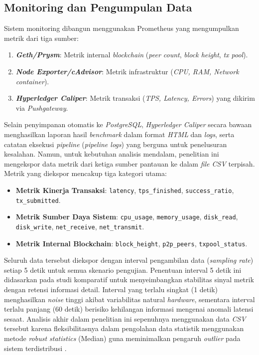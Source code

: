 \subsection{Monitoring dan Pengumpulan Data}
Sistem monitoring dibangun menggunakan Prometheus yang mengumpulkan metrik dari tiga sumber:
\begin{enumerate}
    \item \textbf{\textit{Geth/Prysm}}: Metrik internal \textit{blockchain} (\textit{peer count}, \textit{block height}, \textit{tx pool}).
    \item \textbf{\textit{Node Exporter/cAdvisor}}: Metrik infrastruktur (\textit{CPU, RAM, Network container}).
    \item \textbf{\textit{Hyperledger Caliper}}: Metrik transaksi (\textit{TPS, Latency, Errors}) yang dikirim via \textit{Pushgateway}.
\end{enumerate}

Selain penyimpanan otomatis ke \textit{PostgreSQL}, \textit{Hyperledger Caliper} secara bawaan menghasilkan laporan hasil \textit{benchmark} dalam format \textit{HTML} dan \textit{logs}, serta catatan eksekusi \textit{pipeline} (\textit{pipeline logs}) yang berguna untuk penelusuran kesalahan. Namun, untuk kebutuhan analisis mendalam, penelitian ini mengekspor data metrik dari ketiga sumber pantauan ke dalam \textit{file CSV} terpisah. Metrik yang diekspor mencakup tiga kategori utama:
\begin{itemize}
    \item \textbf{Metrik Kinerja Transaksi}: \texttt{latency}, \texttt{tps\_finished}, \texttt{success\_ratio}, \texttt{tx\_submitted}.
    \item \textbf{Metrik Sumber Daya Sistem}: \texttt{cpu\_usage}, \texttt{memory\_usage}, \texttt{disk\_read}, \texttt{disk\_write}, \texttt{net\_receive}, \texttt{net\_transmit}.
    \item \textbf{Metrik Internal Blockchain}: \texttt{block\_height}, \texttt{p2p\_peers}, \texttt{txpool\_status}.
\end{itemize}

Seluruh data tersebut diekspor dengan interval pengambilan data (\textit{sampling rate}) setiap 5 detik untuk semua skenario pengujian. Penentuan interval 5 detik ini didasarkan pada studi komparatif untuk menyeimbangkan stabilitas sinyal metrik dengan retensi informasi detail. Interval yang terlalu singkat (1 detik) menghasilkan \textit{noise} tinggi akibat variabilitas natural \textit{hardware}, sementara interval terlalu panjang (60 detik) berisiko kehilangan informasi mengenai anomali latensi sesaat. Analisis akhir dalam penelitian ini sepenuhnya menggunakan data \textit{CSV} tersebut karena fleksibilitasnya dalam pengolahan data statistik menggunakan metode \textit{robust statistics} (Median) guna meminimalkan pengaruh \textit{outlier} pada sistem terdistribusi \cite{rousseeuw1993}.

